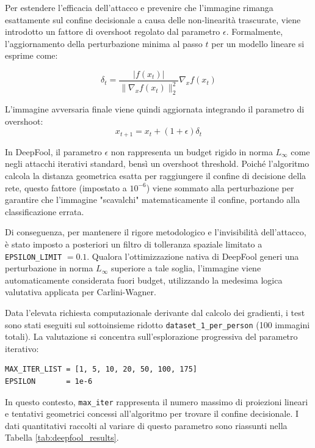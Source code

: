 \documentclass[a4paper, 12pt]{article}
\begin{document}
Per estendere l'efficacia dell'attacco e prevenire che l'immagine rimanga esattamente sul confine decisionale a causa delle non-linearità trascurate, viene introdotto un fattore di overshoot regolato dal parametro $\epsilon$. Formalmente, l'aggiornamento della perturbazione minima al passo $t$ per un modello lineare si esprime come:

$$ \delta_t = \frac{|f(x_t)|}{\|\nabla_x f(x_t)\|_2^2} \nabla_x f(x_t) $$

L'immagine avversaria finale viene quindi aggiornata integrando il parametro di overshoot:
$$ x_{t+1} = x_t + (1 + \epsilon)\delta_t $$

In DeepFool, il parametro $\epsilon$ non rappresenta un budget rigido in norma $L_\infty$ come 
negli attacchi iterativi standard, bensì un overshoot threshold. Poiché l'algoritmo calcola la 
distanza geometrica esatta per raggiungere il confine di decisione della rete, questo fattore 
(impostato a $10^{-6}$) viene sommato alla perturbazione per garantire che l'immagine "scavalchi" 
matematicamente il confine, portando alla classificazione errata.

Di conseguenza, per mantenere il rigore metodologico e l'invisibilità dell'attacco, è stato imposto a posteriori un filtro di tolleranza spaziale limitato a \texttt{EPSILON\_LIMIT} $= 0.1$. Qualora l'ottimizzazione nativa di DeepFool generi una perturbazione in norma $L_\infty$ superiore a tale soglia, l'immagine viene automaticamente considerata fuori budget, utilizzando la medesima logica valutativa applicata per Carlini-Wagner.

Data l'elevata richiesta computazionale derivante dal calcolo dei gradienti, i test sono stati eseguiti sul sottoinsieme ridotto \texttt{dataset\_1\_per\_person} (100 immagini totali). La valutazione si concentra sull'esplorazione progressiva del parametro iterativo:

\begin{verbatim}
MAX_ITER_LIST = [1, 5, 10, 20, 50, 100, 175]
EPSILON       = 1e-6
\end{verbatim}

In questo contesto, \texttt{max\_iter} rappresenta il numero massimo di proiezioni lineari e tentativi geometrici concessi all'algoritmo per trovare il confine decisionale. I dati quantitativi raccolti al variare di questo parametro sono riassunti nella Tabella \ref{tab:deepfool_results}.
\end{document}
